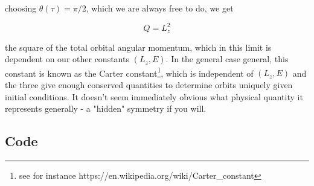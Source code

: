 \documentclass[10pt,a4paper]{report}
\begin{document}
choosing $\theta(\tau) = \pi/2$, which we are always free to do, we get 

\begin{equation*}
Q = L_z^2
\end{equation*}

the square of the total orbital angular momentum, which in this limit is dependent on our other constants $(L_z, E)$. In the general case general, this constant is known as the Carter constant\footnote{see for instance https://en.wikipedia.org/wiki/Carter_constant}, which is independent of $(L_z, E)$ and the three give enough conserved quantities to determine orbits uniquely given initial conditions. It doesn't seem immediately obvious what physical quantity it represents generally - a "hidden" symmetry if you will.


\newpage
\subsection*{Code}
\end{document}
